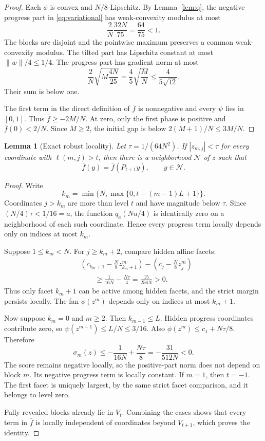 \documentclass[twoside]{article}
\newtheorem{lemma}[theorem]{Lemma}
\begin{document}
\begin{proof}
Each $\phi$ is convex and $N/8$-Lipschitz. By
Lemma~\ref{lem:q}, the negative progress part in \eqref{eq:variational} has
weak-convexity modulus at most
\[
 \frac2N\frac{32N}{75}=\frac{64}{75}<1.
\]
The blocks are disjoint and the pointwise maximum preserves a common
weak-convexity modulus. The tilted part has Lipschitz constant at most
$\|w\|/4\leq1/4$. The progress part has gradient norm at most
\[
 \frac2N\sqrt{M\frac{4N}{25}}
 =\frac45\sqrt{\frac MN}\leq\frac4{5\sqrt{12}}.
\]
Their sum is below one.

The first term in the direct definition of $\bar f$ is nonnegative and every
$\psi$ lies in $[0,1]$. Thus $\bar f\geq-2M/N$. At zero, only the first phase
is positive and $\bar f(0)<2/N$. Since $M\geq2$, the initial gap is below
$2(M+1)/N\leq3M/N$.
\end{proof}

\begin{lemma}[Exact robust locality]
\label{lem:locality}
Let $\tau=1/(64N^2)$. If $|z_{m,j}|<\tau$ for every coordinate with
$\ell(m,j)>t$, then there is a neighborhood $\mathcal N$ of $z$ such that
\[
 \bar f(y)=\bar f(P_{t+1}y),\qquad y\in\mathcal N.
\]
\end{lemma}

\begin{proof}
Write
\[
 k_m=\min\{N,\max\{0,t-(m-1)L+1\}\}.
\]
Coordinates $j>k_m$ are more than level $t$ and have magnitude below
$\tau$. Since
$(N/4)\tau<1/16=a$, the function $q_a(Nu/4)$ is identically zero on a
neighborhood of each such coordinate. Hence every progress term locally
depends only on indices at most $k_m$.

Suppose $1\leq k_m<N$. For $j\geq k_m+2$, compare hidden affine facets:
\begin{align*}
 &\left(c_{k_m+1}-\frac N8z^m_{k_m+1}\right)
 -\left(c_j-\frac N8z^m_j\right)\\
 &\qquad\geq \frac1{16N}-\frac{N\tau}{4}
 =\frac{15}{256N}>0.
\end{align*}
Thus only facet $k_m+1$ can be active among hidden facets, and the strict
margin persists locally. The fan $\phi(z^m)$ depends only on indices at most
$k_m+1$.

Now suppose $k_m=0$ and $m\geq2$. Then $k_{m-1}\leq L$. Hidden progress
coordinates contribute zero, so $\psi(z^{m-1})\leq L/N\leq3/16$. Also
$\phi(z^m)\leq c_1+N\tau/8$. Therefore
\[
 \sigma_m(z)\leq-\frac1{16N}+\frac{N\tau}{8}
 =-\frac{31}{512N}<0.
\]
The score remains negative locally, so the positive-part norm does not depend
on block $m$. Its negative progress term is locally constant. If $m=1$, then
$t=-1$. The first facet is uniquely largest, by the same strict facet
comparison, and it belongs to level zero.

Fully revealed blocks already lie in $V_t$. Combining the cases shows that
every term in $\bar f$ is locally independent of coordinates beyond
$V_{t+1}$, which proves the identity.
\end{proof}
\end{document}
